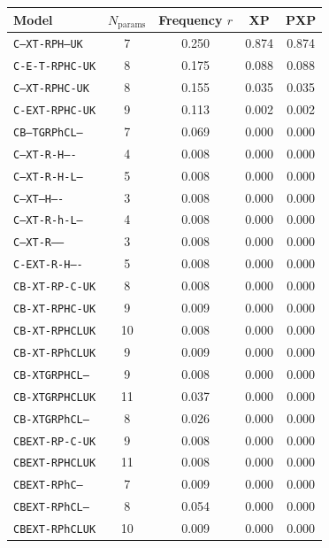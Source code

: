 \begin{tabular}{lcccc}
\toprule
Model & $N_{\text{params}}$ & Frequency $r$ & XP & PXP \\
\midrule
\texttt{C--XT-RPH--UK} & 7 & 0.250 & 0.874 & 0.874 \\
\texttt{C-E-T-RPHC-UK} & 8 & 0.175 & 0.088 & 0.088 \\
\texttt{C--XT-RPHC-UK} & 8 & 0.155 & 0.035 & 0.035 \\
\texttt{C-EXT-RPHC-UK} & 9 & 0.113 & 0.002 & 0.002 \\
\texttt{CB--TGRPhCL--} & 7 & 0.069 & 0.000 & 0.000 \\
\texttt{C--XT-R-H----} & 4 & 0.008 & 0.000 & 0.000 \\
\texttt{C--XT-R-H-L--} & 5 & 0.008 & 0.000 & 0.000 \\
\texttt{C--XT---H----} & 3 & 0.008 & 0.000 & 0.000 \\
\texttt{C--XT-R-h-L--} & 4 & 0.008 & 0.000 & 0.000 \\
\texttt{C--XT-R------} & 3 & 0.008 & 0.000 & 0.000 \\
\texttt{C-EXT-R-H----} & 5 & 0.008 & 0.000 & 0.000 \\
\texttt{CB-XT-RP-C-UK} & 8 & 0.008 & 0.000 & 0.000 \\
\texttt{CB-XT-RPHC-UK} & 9 & 0.009 & 0.000 & 0.000 \\
\texttt{CB-XT-RPHCLUK} & 10 & 0.008 & 0.000 & 0.000 \\
\texttt{CB-XT-RPhCLUK} & 9 & 0.009 & 0.000 & 0.000 \\
\texttt{CB-XTGRPHCL--} & 9 & 0.008 & 0.000 & 0.000 \\
\texttt{CB-XTGRPHCLUK} & 11 & 0.037 & 0.000 & 0.000 \\
\texttt{CB-XTGRPhCL--} & 8 & 0.026 & 0.000 & 0.000 \\
\texttt{CBEXT-RP-C-UK} & 9 & 0.008 & 0.000 & 0.000 \\
\texttt{CBEXT-RPHCLUK} & 11 & 0.008 & 0.000 & 0.000 \\
\texttt{CBEXT-RPhC---} & 7 & 0.009 & 0.000 & 0.000 \\
\texttt{CBEXT-RPhCL--} & 8 & 0.054 & 0.000 & 0.000 \\
\texttt{CBEXT-RPhCLUK} & 10 & 0.009 & 0.000 & 0.000 \\
\bottomrule
\end{tabular}
